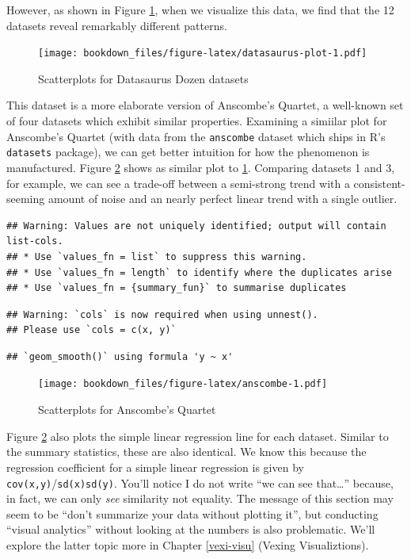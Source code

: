 \documentclass[
]{krantz}
\begin{document}
However, as shown in Figure \ref{fig:datasaurus-plot}, when we visualize this data, we find that the 12 datasets reveal remarkably different patterns.

\begin{figure}
\centering
\texttt{[image: bookdown\_files/figure-latex/datasaurus-plot-1.pdf]}
\caption{\label{fig:datasaurus-plot}Scatterplots for Datasaurus Dozen datasets}
\end{figure}

This dataset is a more elaborate version of Anscombe's Quartet, a well-known set of four datasets which exhibit similar properties.
Examining a simiilar plot for Anscombe's Quartet (with data from the \texttt{anscombe} dataset which ships in R's \texttt{datasets} package), we can get better intuition for how the phenomenon is manufactured.
Figure \ref{fig:anscombe} shows as similar plot to \ref{fig:datasaurus-plot}.
Comparing datasets 1 and 3, for example, we can see a trade-off between a semi-strong trend with a consistent-seeming amount of noise and an nearly perfect linear trend with a single outlier.

\begin{verbatim}
## Warning: Values are not uniquely identified; output will contain list-cols.
## * Use `values_fn = list` to suppress this warning.
## * Use `values_fn = length` to identify where the duplicates arise
## * Use `values_fn = {summary_fun}` to summarise duplicates
\end{verbatim}

\begin{verbatim}
## Warning: `cols` is now required when using unnest().
## Please use `cols = c(x, y)`
\end{verbatim}

\begin{verbatim}
## `geom_smooth()` using formula 'y ~ x'
\end{verbatim}

\begin{figure}
\centering
\texttt{[image: bookdown\_files/figure-latex/anscombe-1.pdf]}
\caption{\label{fig:anscombe}Scatterplots for Anscombe's Quartet}
\end{figure}

Figure \ref{fig:anscombe} also plots the simple linear regression line for each dataset.
Similar to the summary statistics, these are also identical.
We know this because the regression coefficient for a simple linear regression is given by \texttt{cov(x,y)}/\texttt{sd(x)sd(y)}. You'll notice I do not write ``we can see that\ldots{}'' because, in fact, we can only \emph{see} similarity not equality.
The message of this section may seem to be ``don't summarize your data without plotting it'', but conducting ``visual analytics'' without looking at the numbers is also problematic.
We'll explore the latter topic more in Chapter \ref{vexi-visu} (Vexing Visualiztions).
\end{document}
